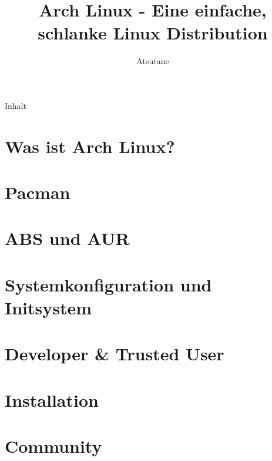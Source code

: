 \documentclass[mode=print,paper=screen,size=10pt,style=horatio]{powerdot}
\author{Atsutane}
\title{Arch Linux - Eine einfache, schlanke Linux Distribution}
\begin{document}
\maketitle
\begin{slide}{Inhalt}
  \tableofcontents[content=sections]
\end{slide}



\section{Was ist Arch Linux?}


\section{Pacman}


\section{ABS und AUR}


\section{Systemkonfiguration und Initsystem}


\section{Developer \& Trusted User}


\section{Installation}


\section{Community}

\end{document}
